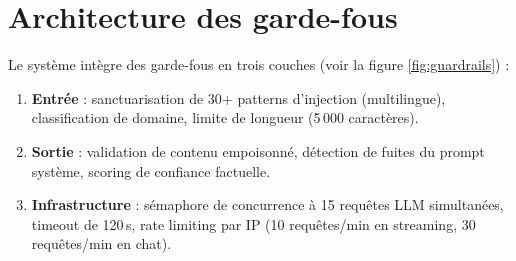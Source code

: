 \documentclass[12pt,a4paper,oneside]{report}
\begin{document}
\section{Architecture des garde-fous}



Le syst\`{e}me int\`{e}gre des garde-fous en trois couches (voir la figure \ref{fig:guardrails}) :



\begin{enumerate}[leftmargin=1.2cm]

\item \textbf{Entr\'{e}e} : sanctuarisation de 30+ patterns d'injection (multilingue), classification de domaine, limite de longueur (5\,000 caract\`{e}res).

\item \textbf{Sortie} : validation de contenu empoisonn\'{e}, d\'{e}tection de fuites du prompt syst\`{e}me, scoring de confiance factuelle.

\item \textbf{Infrastructure} : s\'{e}maphore de concurrence \`{a} 15 requ\^{e}tes LLM simultan\'{e}es, timeout de 120\,s, rate limiting par IP (10 requ\^{e}tes/min en streaming, 30 requ\^{e}tes/min en chat).

\end{enumerate}
\end{document}
